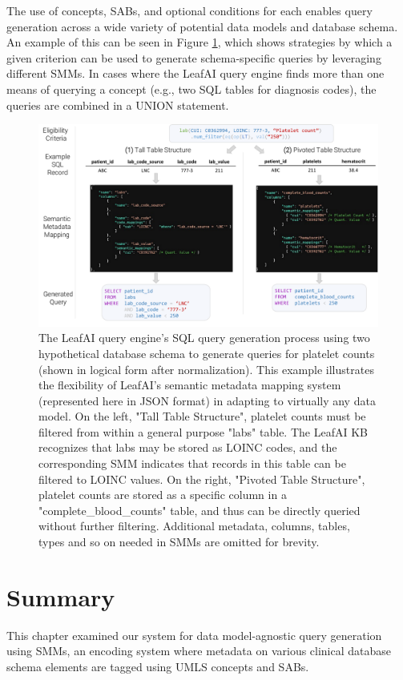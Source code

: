 \documentclass[../main.tex]{subfiles}
\begin{document}
The use of concepts, SABs, and optional conditions for each enables query generation across a wide variety of potential data models and database schema. An example of this can be seen in Figure \ref{fig_leafai_smm}, which shows strategies by which a given criterion can be used to generate schema-specific queries by leveraging different SMMs. In cases where the LeafAI query engine finds more than one means of querying a concept (e.g., two SQL tables for diagnosis codes), the queries are combined in a UNION statement.

\begin{figure}[h!]
  \includegraphics[scale=0.47]{Figures/6_smm/leafai_smm.pdf}  
\caption{The LeafAI query engine's SQL query generation process using two hypothetical database schema to generate queries for platelet counts (shown in logical form after normalization). This example illustrates the flexibility of LeafAI's semantic metadata mapping system (represented here in JSON format) in adapting to virtually any data model. On the left, "Tall Table Structure", platelet counts must be filtered from within a general purpose "labs" table. The LeafAI KB recognizes that labs may be stored as LOINC codes, and the corresponding SMM indicates that records in this table can be filtered to LOINC values. On the right, "Pivoted Table Structure", platelet counts are stored as a specific column in a "complete\_blood\_counts" table, and thus can be directly queried without further filtering. Additional metadata, columns, tables, types and so on needed in SMMs are omitted for brevity.}
\label{fig_leafai_smm}
\end{figure}

\section{Summary}

This chapter examined our system for data model-agnostic query generation using SMMs, an encoding system where metadata on various clinical database schema elements are tagged using UMLS concepts and SABs. 
\end{document}
